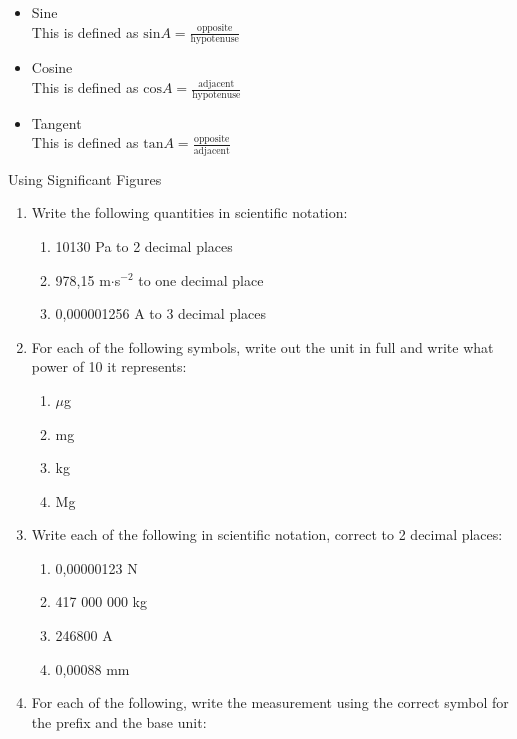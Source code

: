 \begin{enumerate}[label=\textbf{\arabic*}.]
\begin{itemize}
 \item Sine\\
This is defined as $\text{sin} A = \frac{\text{opposite}}{\text{hypotenuse}}$
\item Cosine \\
This is defined as $\text{cos} A = \frac{\text{adjacent}}{\text{hypotenuse}}$
\item Tangent \\
This is defined as $\text{tan} A = \frac{\text{opposite}}{\text{adjacent}}$
\end{itemize}
\begin{exercises}{Using Significant Figures }
            \nopagebreak
\begin{enumerate}[noitemsep, label=\textbf{\arabic*}. ] 
\item Write the following quantities in scientific notation:
\begin{enumerate}[noitemsep, label=\textbf{\alph*}. ] 
\item 10130 Pa to 2 decimal places
\item 978,15 m$\ensuremath{\cdot}$s${}^{-2}$ to one decimal place
\item 0,000001256 A to 3 decimal places
\end{enumerate}
\item For each of the following symbols, write out the unit in full and write what power of 10 it represents:
  \begin{enumerate}[noitemsep, label=\textbf{\alph*}. ] 
  \item $\mu $g
  \item mg
  \item kg
  \item Mg
  \end{enumerate}
\item Write each of the following in scientific notation, correct to 2 decimal places:
  \begin{enumerate}[noitemsep, label=\textbf{\alph*}. ] 
  \item 0,00000123 N
  \item 417 000 000 kg
  \item 246800 A
  \item 0,00088 mm
  \end{enumerate}
\item For each of the following, write the measurement using the correct symbol for the prefix and the base unit:
  \begin{enumerate}[noitemsep, label=\textbf{\alph*}. ] 

\end{enumerate}
\end{enumerate}
\end{exercises}
\end{enumerate}
